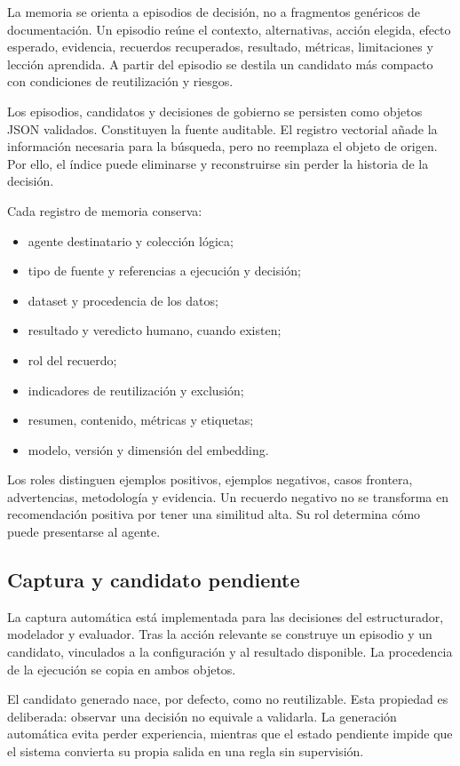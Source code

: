 La memoria se orienta a episodios de decisión, no a fragmentos genéricos de
documentación. Un episodio reúne el contexto, alternativas, acción elegida,
efecto esperado, evidencia, recuerdos recuperados, resultado, métricas,
limitaciones y lección aprendida. A partir del episodio se destila un candidato
más compacto con condiciones de reutilización y riesgos.

Los episodios, candidatos y decisiones de gobierno se persisten como objetos
JSON validados. Constituyen la fuente auditable. El registro vectorial añade la
información necesaria para la búsqueda, pero no reemplaza el objeto de origen.
Por ello, el índice puede eliminarse y reconstruirse sin perder la historia de
la decisión.

Cada registro de memoria conserva:

\begin{itemize}
  \item agente destinatario y colección lógica;
  \item tipo de fuente y referencias a ejecución y decisión;
  \item dataset y procedencia de los datos;
  \item resultado y veredicto humano, cuando existen;
  \item rol del recuerdo;
  \item indicadores de reutilización y exclusión;
  \item resumen, contenido, métricas y etiquetas;
  \item modelo, versión y dimensión del embedding.
\end{itemize}

Los roles distinguen ejemplos positivos, ejemplos negativos, casos frontera,
advertencias, metodología y evidencia. Un recuerdo negativo no se transforma
en recomendación positiva por tener una similitud alta. Su rol determina cómo
puede presentarse al agente.

\subsection{Captura y candidato pendiente}

La captura automática está implementada para las decisiones del estructurador,
modelador y evaluador. Tras la acción relevante se construye un episodio y un
candidato, vinculados a la configuración y al resultado disponible. La
procedencia de la ejecución se copia en ambos objetos.

El candidato generado nace, por defecto, como no reutilizable. Esta propiedad
es deliberada: observar una decisión no equivale a validarla. La generación
automática evita perder experiencia, mientras que el estado pendiente impide
que el sistema convierta su propia salida en una regla sin supervisión.

